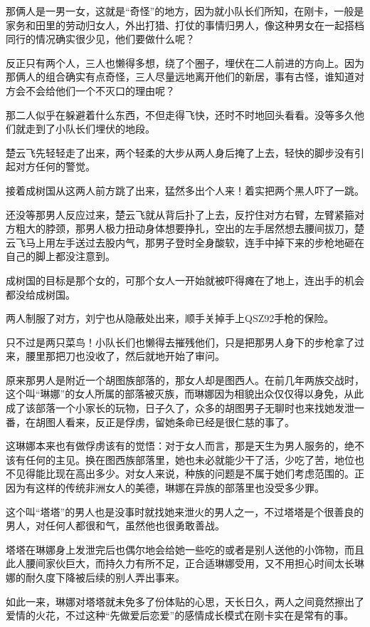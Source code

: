 那俩人是一男一女，这就是“奇怪”的地方，因为就小队长们所知，在刚卡，一般是家务和田里的劳动归女人，外出打猎、打仗的事情归男人，像这种男女在一起搭档同行的情况确实很少见，他们要做什么呢？

反正只有两个人，三人也懒得多想，绕了个圈子，埋伏在二人前进的方向上。因为那俩人的组合确实有点奇怪，三人尽量远地离开他们的新居，事有古怪，谁知道对方会不会给他们一个不灭口的理由呢？

那二人似乎在躲避着什么东西，不但走得飞快，还时不时地回头看看。没等多久他们就走到了小队长们埋伏的地段。

楚云飞先轻轻走了出来，两个轻柔的大步从两人身后掩了上去，轻快的脚步没有引起对方任何的警觉。

接着成树国从这两人前方跳了出来，猛然多出个人来！着实把两个黑人吓了一跳。

还没等那男人反应过来，楚云飞就从背后扑了上去，反拧住对方右臂，左臂紧箍对方粗大的脖颈，那男人极力扭动身体想要挣扎，空出的左手居然想去腰间拔刀，楚云飞马上用左手送过去股内气，那男子登时全身酸软，连手中掉下来的步枪地砸在自己的脚上都没注意到。

成树国的目标是那个女的，可那个女人一开始就被吓得瘫在了地上，连出手的机会都没给成树国。

两人制服了对方，刘宁也从隐蔽处出来，顺手关掉手上QSZ92手枪的保险。

只不过是两只菜鸟！小队长们也懒得去摧残他们，只是把那男人身下的步枪拿了过来，腰里那把刀也没收了，然后就地开始了审问。

原来那男人是附近一个胡图族部落的，那女人却是图西人。在前几年两族交战时，这个叫“琳娜”的女人所属的部落被灭族，而琳娜因为相貌出众仅仅得以身免，从此成了该部落一个小家长的玩物，日子久了，众多的胡图男子无聊时也来找她发泄一番，在胡图人看来，反正是俘虏，留她条命已经是很仁慈的事了。

这琳娜本来也有做俘虏该有的觉悟：对于女人而言，那是天生为男人服务的，绝不该有任何的主见。换在图西族部落里，她也未必就能少干了活，少吃了苦，地位也不见得能比现在高出多少。对女人来说，种族的问题是不属于她们考虑范围的。正因为有这样的传统非洲女人的美德，琳娜在异族的部落里也没受多少罪。

这个叫“塔塔”的男人也是没事时就找她来泄火的男人之一，不过塔塔是个很善良的男人，对任何人都很和气，虽然他也很勇敢善战。

塔塔在琳娜身上发泄完后也偶尔地会给她一些吃的或者是别人送他的小饰物，而且此人腰间家伙巨大，而持久力有所不足，正合适琳娜受用，又不用担心时间太长琳娜的耐久度下降被后续的别人弄出事来。

如此一来，琳娜对塔塔就未免多了份体贴的心思，天长日久，两人之间竟然擦出了爱情的火花，不过这种“先做爱后恋爱”的感情成长模式在刚卡实在是常有的事。

